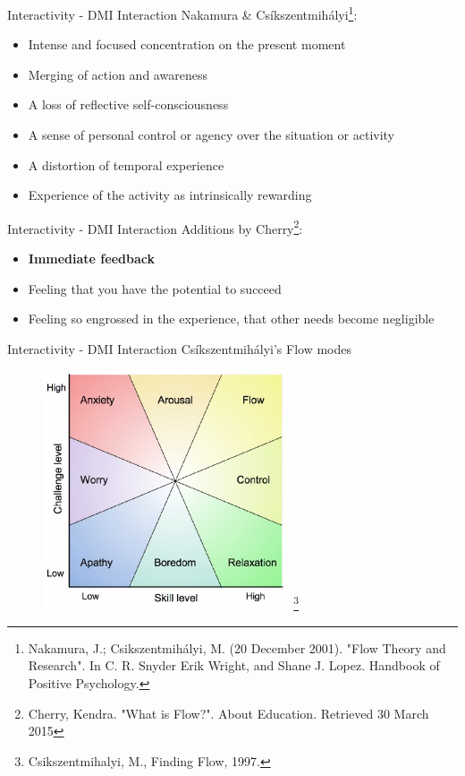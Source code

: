 \documentclass{beamer}
\newcommand\blfootnote[1]{%
  \begingroup
  \renewcommand\thefootnote{}\footnote{#1}%
  \addtocounter{footnote}{-1}%
  \endgroup
}
\begin{document}
\begin{frame}{Interactivity - DMI Interaction} 
    Nakamura \& Csíkszentmihályi\footnote{Nakamura, J.; Csikszentmihályi, M. (20 December 2001). "Flow Theory and Research". In C. R. Snyder Erik Wright, and Shane J. Lopez. Handbook of Positive Psychology.}:
    \begin{itemize}
        \item Intense and focused concentration on the present moment
        \item Merging of action and awareness
        \item A loss of reflective self-consciousness
        \item A sense of personal control or agency over the situation or activity
        \item A distortion of temporal experience
        \item Experience of the activity as intrinsically rewarding
    \end{itemize}
\end{frame}

\begin{frame}{Interactivity - DMI Interaction} 
    Additions by Cherry\footnote{Cherry, Kendra. "What is Flow?". About Education. Retrieved 30 March 2015}:
    \begin{itemize}
        \item \textbf{Immediate feedback}
        \item Feeling that you have the potential to succeed
        \item Feeling so engrossed in the experience, that other needs become negligible
    \end{itemize}
\end{frame}

\begin{frame}{Interactivity - DMI Interaction} 
    Csíkszentmihályi's Flow modes
    \begin{figure}[h]
        \includegraphics[width=0.65\textwidth]{flow.jpg}\blfootnote{Csikszentmihalyi, M., Finding Flow, 1997.}
    \end{figure}
\end{frame}
\end{document}
